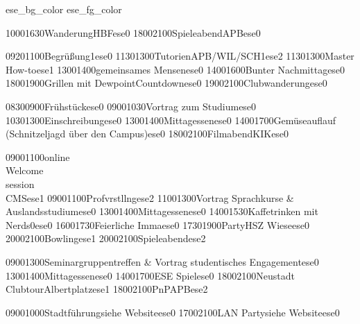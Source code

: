 \documentclass[a5paper,7pt]{scrreprt}
\begin{document}
\thispagestyle{empty}

\setslotsize{3.00cm}{0.25cm}
\settextframe{0.8mm}

\seteventcornerradius{0pt}



%
  {ese_bg_color}
  {ese_fg_color}
\begin{center}
\begin{timetable}
   {1000}{1630}{Wanderung}{}{HBF}{}{ese}{0}
   {1800}{2100}{Spieleabend}{}{APB}{}{ese}{0}

   {0920}{1100}{Begrüßung}{}{}{1}{ese}{0}
   {1130}{1300}{Tutorien}{}{APB/WIL/SCH}{1}{ese}{2}
   {1130}{1300}{Master\\How-to}{}{}{}{ese}{1}
   {1300}{1400}{gemeinsames Mensen}{}{}{}{ese}{0}
   {1400}{1600}{Bunter Nachmittag}{}{}{}{ese}{0}
   {1800}{1900}{Grillen mit Dewpoint}{}{Countdown}{}{ese}{0}
   {1900}{2100}{Clubwanderung}{}{}{}{ese}{0}

   {0830}{0900}{Frühstück}{}{}{}{ese}{0}
   {0900}{1030}{Vortrag zum Studium}{}{}{}{ese}{0}
   {1030}{1300}{Einschreibung}{}{}{}{ese}{0}
   {1300}{1400}{Mittagessen}{}{}{}{ese}{0}
   {1400}{1700}{Gemüseauflauf (Schnitzeljagd über den Campus)}{}{}{}{ese}{0}
   {1800}{2100}{Filmabend}{}{KIK}{}{ese}{0}


   {0900}{1100}{online\\Welcome\\session\\CMS}{}{}{}{ese}{1}
   {0900}{1100}{Profvrstllng}{}{}{}{ese}{2}
   {1100}{1300}{Vortrag Sprachkurse \& Auslandsstudium}{}{}{}{ese}{0}
   {1300}{1400}{Mittagessen}{}{}{}{ese}{0}
   {1400}{1530}{Kaffetrinken mit Nerds}{}{}{0}{ese}{0}
   {1600}{1730}{Feierliche Imma}{}{}{}{ese}{0}
   {1730}{1900}{Party}{}{HSZ Wiese}{}{ese}{0}
   {2000}{2100}{Bowling}{}{}{}{ese}{1}
   {2000}{2100}{Spieleabend}{}{}{}{ese}{2}

   {0900}{1300}{Seminargruppentreffen \& Vortrag studentisches Engagement}{}{}{}{ese}{0}
   {1300}{1400}{Mittagessen}{}{}{}{ese}{0}
   {1400}{1700}{ESE Spiel}{}{}{}{ese}{0}
   {1800}{2100}{Neustadt\\ Clubtour}{}{Albertplatz}{}{ese}{1}
   {1800}{2100}{PnP}{}{APB}{}{ese}{2}
  
   {0900}{1000}{Stadtführung}{}{siehe Website}{}{ese}{0}
   {1700}{2100}{LAN Party}{}{siehe Website}{}{ese}{0}
\end{timetable}
\end{center}
\end{document}
